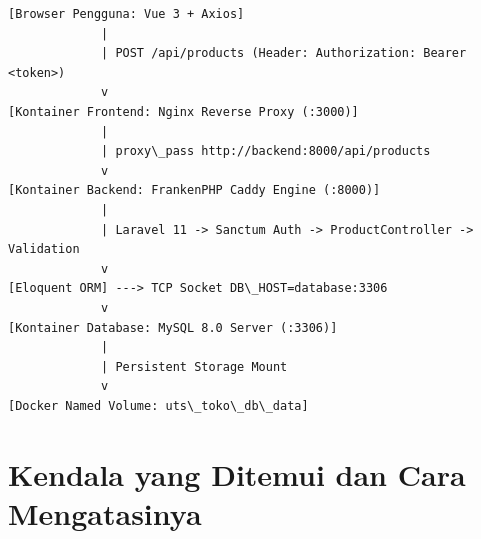 \documentclass[11pt,a4paper]{article}
\begin{document}
\begin{center}
\begin{verbatim}
[Browser Pengguna: Vue 3 + Axios]
             |
             | POST /api/products (Header: Authorization: Bearer <token>)
             v
[Kontainer Frontend: Nginx Reverse Proxy (:3000)]
             |
             | proxy\_pass http://backend:8000/api/products
             v
[Kontainer Backend: FrankenPHP Caddy Engine (:8000)]
             |
             | Laravel 11 -> Sanctum Auth -> ProductController -> Validation
             v
[Eloquent ORM] ---> TCP Socket DB\_HOST=database:3306
             v
[Kontainer Database: MySQL 8.0 Server (:3306)]
             |
             | Persistent Storage Mount
             v
[Docker Named Volume: uts\_toko\_db\_data]
\end{verbatim}
\end{center}

\newpage
\section{Kendala yang Ditemui dan Cara Mengatasinya}
\end{document}
